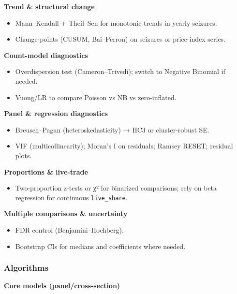\documentclass[
]{article}
\providecommand{\tightlist}{%
  \setlength{\itemsep}{0pt}\setlength{\parskip}{0pt}}
\begin{document}
\textbf{Trend \& structural change}

\begin{itemize}
\tightlist
\item
  Mann--Kendall + Theil--Sen for monotonic trends in yearly seizures.
\item
  Change-points (CUSUM, Bai--Perron) on seizures or price-index series.
\end{itemize}

\textbf{Count-model diagnostics}

\begin{itemize}
\tightlist
\item
  Overdispersion test (Cameron--Trivedi); switch to Negative Binomial if
  needed.
\item
  Vuong/LR to compare Poisson vs NB vs zero-inflated.
\end{itemize}

\textbf{Panel \& regression diagnostics}

\begin{itemize}
\tightlist
\item
  Breusch--Pagan (heteroskedasticity) → HC3 or cluster-robust SE.
\item
  VIF (multicollinearity); Moran's I on residuals; Ramsey RESET;
  residual plots.
\end{itemize}

\textbf{Proportions \& live-trade}

\begin{itemize}
\tightlist
\item
  Two-proportion z-tests or χ² for binarized comparisons; rely on beta
  regression for continuous \texttt{live\_share}.
\end{itemize}

\textbf{Multiple comparisons \& uncertainty}

\begin{itemize}
\tightlist
\item
  FDR control (Benjamini--Hochberg).
\item
  Bootstrap CIs for medians and coefficients where needed.
\end{itemize}

\subsubsection{Algorithms}\label{algorithms}

\textbf{Core models (panel/cross-section)}
\end{document}
